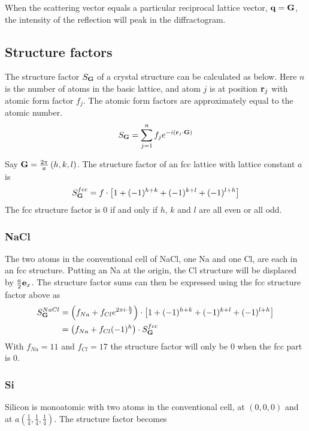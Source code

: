 \documentclass[a4paper,twoside=false,abstract=false,numbers=noenddot,
titlepage=false,headings=small,parskip=half,version=last]{scrartcl}
\begin{document}
When the scattering vector equals a particular reciprocal lattice vector, $\bold{q} = \bold{G}$, the intensity of the reflection will peak in the diffractogram. 


\subsection{Structure factors}
The structure factor $S_{\bold{G}}$ of a crystal structure can be calculated as below. Here $n$ is the number of atoms in the basic lattice, and atom $j$ is at position $\bold{r}_j$ with atomic form factor $f_j$. The atomic form factors are approximately equal to the atomic number.\\
\begin{equation}
    S_{\bold{G}} = \sum^n_{j=1} f_j e^{-i \left( \bold{r}_j \cdot \bold{G}\right)}
\end{equation}

Say $\bold{G} = \frac{2\pi}{a}\left( h,k,l \right)$. The structure factor of an fcc lattice with lattice constant $a$ is
\begin{equation}
    S^{fcc}_{\bold{G}} = f\cdot \left[ 1 + (-1)^{h+k} + (-1)^{k+l} + (-1)^{l+h}\right]
\end{equation}
The fcc structure factor is 0 if and only if $h$, $k$ and $l$ are all even or all odd.\\

\subsubsection{NaCl}
The two atoms in the conventional cell of NaCl, one Na and one Cl, are each in an fcc structure.
Putting an Na at the origin, the Cl structure will be displaced by $\frac{a}{2}\bold{e}_x$.
The structure factor sums can then be expressed using the fcc structure factor above as
\begin{align}
    S^{NaCl}_{\bold{G}}
    &= \left( f_{Na} + f_{Cl}e^{2\pi i\cdot \frac{h}{2}} \right) \cdot \left[ 1 + (-1)^{h+k} + (-1)^{k+l} + (-1)^{l+h}\right]\nonumber\\
    &= \left( f_{Na} + f_{Cl}(-1)^{h} \right) \cdot S^{fcc}_{\bold{G}}
\end{align}\label{naclstructure}
With $f_{Na}=11$ and $f_{Cl}=17$ the structure factor will only be $0$ when the fcc part is $0$.
\subsubsection{Si}
Silicon is monoatomic with two atoms in the conventional cell, at $(0,0,0)$ and at $a(\frac{1}{4},\frac{1}{4},\frac{1}{4})$.
The structure factor becomes
\end{document}
